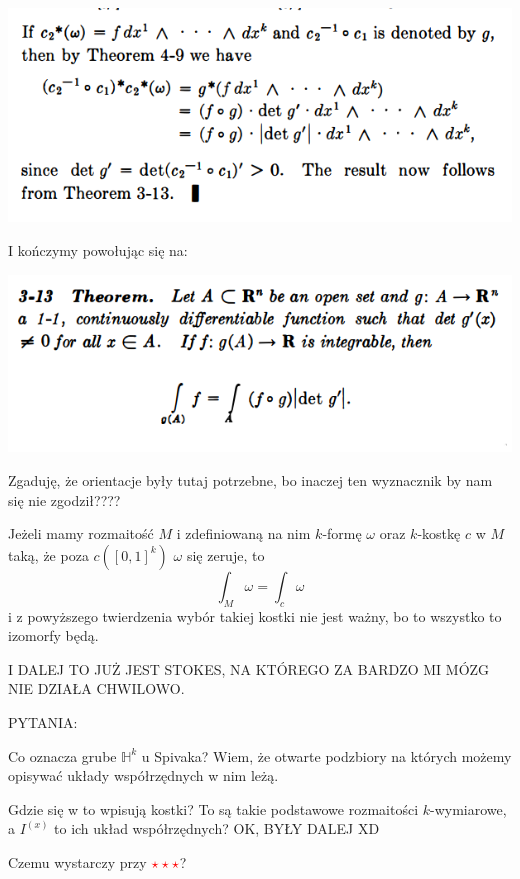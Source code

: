 \documentclass{article}
\begin{document}
\includegraphics[width=\textwidth]{5.4.png}

I kończymy powołując się na:

\includegraphics[width=\textwidth]{3.13.png}

Zgaduję, że orientacje były tutaj potrzebne, bo inaczej ten wyznacznik by nam się nie zgodził????

Jeżeli mamy rozmaitość $M$ i zdefiniowaną na nim $k$-formę $\omega$ oraz $k$-kostkę $c$ w $M$ taką, że poza $c([0,1]^k)$ $\omega$ się zeruje, to
$$\int_M\omega=\int_c\omega$$
i z powyższego twierdzenia wybór takiej kostki nie jest ważny, bo to wszystko to izomorfy będą.
\medskip

{\color{acc}I DALEJ TO JUŻ JEST STOKES, NA KTÓREGO ZA BARDZO MI MÓZG NIE DZIAŁA CHWILOWO}.


\bigskip

{\Large\color{acc}PYTANIA}:
\smallskip

Co oznacza grube $\mathbb{H}^k$ u Spivaka? Wiem, że otwarte podzbiory na których możemy opisywać układy współrzędnych w nim leżą.
\smallskip

Gdzie się w to wpisują kostki? To są takie podstawowe rozmaitości $k$-wymiarowe, a $I^(x)$ to ich układ współrzędnych? OK, BYŁY DALEJ XD
\smallskip

Czemu wystarczy przy $\color{red}\star\star\star$?
\end{document}
